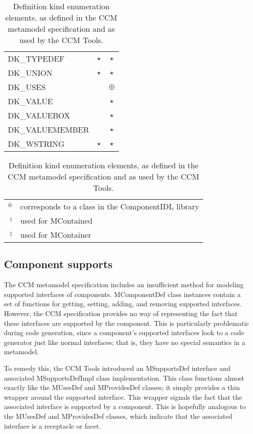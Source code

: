 \begin{table}
\begin{minifbox}
\begin{tabular}{lcc}
DK\_TYPEDEF       & $\star$ & $\star$    \\
DK\_UNION         & $\star$ & $\star$    \\ \hline
DK\_USES          &         & $\oplus$   \\
DK\_VALUE         &         & $\star$    \\
DK\_VALUEBOX      &         & $\star$    \\
DK\_VALUEMEMBER   &         & $\star$    \\
DK\_WSTRING       & $\star$ & $\star$    \\ \hline
\end{tabular}
\begin{tabular}{rl}
\\
$^\oplus$ & corresponds to a class in the ComponentIDL library \\
$^\dagger$ & used for MContained \\
$^\ddagger$ & used for MContainer
\end{tabular}
\end{minifbox}
\label{table:component-definition-kinds}
\caption{Definition kind enumeration elements, as defined in the CCM metamodel
specification and as used by the CCM Tools.}
\end{table}

\subsection{Component supports}
\label{subsection:metamodel-problems-supports}

The CCM metamodel specification includes an insufficient method for modeling
supported interfaces of components. MComponentDef class instances contain a set
of functions for getting, setting, adding, and removing supported interfaces.
However, the CCM specification provides no way of representing the fact that
these interfaces are supported by the component. This is particularly
problematic during code generation, since a component's supported interfaces
look to a code generator just like normal interfaces; that is, they have no
special semantics in a metamodel.

To remedy this, the CCM Tools introduced an MSupportsDef interface and
associated MSupportsDefImpl class implementation. This class functions almost
exactly like the MUsesDef and MProvidesDef classes; it simply provides a thin
wrapper around the supported interface. This wrapper signals the fact that the
associated interface is supported by a component. This is hopefully analogous to
the MUsesDef and MProvidesDef classes, which indicate that the associated
interface is a receptacle or facet.

